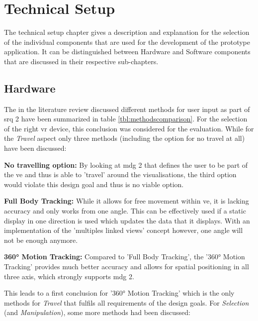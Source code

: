 
\section{Technical Setup}

The technical setup chapter gives a description and explanation for the selection of the individual components that are used for the development of the prototype application. It can be distinguished between Hardware and Software components that are discussed in their respective sub-chapters.


\subsection{Hardware}

The in the literature review discussed different methods for user input as part of \gls{srq} 2 have been summarized in table \ref{tbl:methodscomparison}. For the selection of the right \gls{vr} device, this conclusion was considered for the evaluation. While for the \textit{Travel} aspect only three methods (including the option for no travel at all) have been discussed:

\textbf{No travelling option:}
By looking at \gls{mdg} 2 that defines the user to be part of the \gls{ve} and thus is able to 'travel' around the visualisations, the third option would violate this design goal and thus is no viable option.

\textbf{Full Body Tracking:}
While it allows for free movement within \gls{ve}, it is lacking accuracy and only works from one angle. This can be effectively used if a static display in one direction is used which updates the data that it displays. With an implementation of the 'multiples linked views' concept however, one angle will not be enough anymore.

\textbf{360° Motion Tracking:}
Compared to 'Full Body Tracking', the '360° Motion Tracking' provides much better accuracy and allows for spatial positioning in all three axis, which strongly supports \gls{mdg} 2.


This leads to a first conclusion for '360° Motion Tracking' which is the only methods for \textit{Travel} that fulfils all requirements of the design goals. For \textit{Selection} (and \textit{Manipulation}), some more methods had been discussed:

